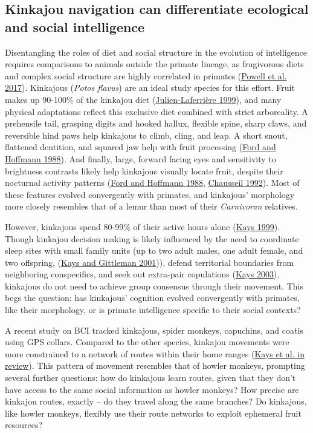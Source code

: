 \documentclass[twoside,12pt,final]{ucthesis-CA2012}
\begin{document}
\begin{ucmainmatter}
\hypertarget{kinkajou-navigation-can-differentiate-ecological-and-social-intelligence}{%
\subsection{Kinkajou navigation can differentiate ecological and social intelligence}\label{kinkajou-navigation-can-differentiate-ecological-and-social-intelligence}}

Disentangling the roles of diet and social structure in the evolution of intelligence requires comparisons to animals outside the primate lineage, as frugivorous diets and complex social structure are highly correlated in primates (\protect\hyperlink{ref-powell2017a}{Powell et al. 2017}). Kinkajous (\emph{Potos flavus}) are an ideal study species for this effort. Fruit makes up 90-100\% of the kinkajou diet (\protect\hyperlink{ref-julien-laferriere1999}{Julien-Laferrière 1999}), and many physical adaptations reflect this exclusive diet combined with strict arboreality. A prehensile tail, grasping digits and hooked hallux, flexible spine, sharp claws, and reversible hind paws help kinkajous to climb, cling, and leap. A short snout, flattened dentition, and squared jaw help with fruit processing (\protect\hyperlink{ref-ford1988}{Ford and Hoffmann 1988}). And finally, large, forward facing eyes and sensitivity to brightness contrasts likely help kinkajous visually locate fruit, despite their nocturnal activity patterns (\protect\hyperlink{ref-ford1988}{Ford and Hoffmann 1988}, \protect\hyperlink{ref-chausseil1992}{Chausseil 1992}). Most of these features evolved convergently with primates, and kinkajous' morphology more closely resembles that of a lemur than most of their \emph{Carnivoran} relatives.

However, kinkajous spend 80-99\% of their active hours alone (\protect\hyperlink{ref-kays1999a}{Kays 1999}). Though kinkajou decision making is likely influenced by the need to coordinate sleep sites with small family units (up to two adult males, one adult female, and two offspring, (\protect\hyperlink{ref-kays2001}{Kays and Gittleman 2001})), defend territorial boundaries from neighboring conspecifics, and seek out extra-pair copulations (\protect\hyperlink{ref-kays2003}{Kays 2003}), kinkajous do not need to achieve group consensus through their movement. This begs the question: has kinkajous' cognition evolved convergently with primates, like their morphology, or is primate intelligence specific to their social contexts?

A recent study on BCI tracked kinkajous, spider monkeys, capuchins, and coatis using GPS collars. Compared to the other species, kinkajou movements were more constrained to a network of routes within their home ranges (\protect\hyperlink{ref-kaysinreview}{Kays et al. in review}). This pattern of movement resembles that of howler monkeys, prompting several further questions: how do kinkajous learn routes, given that they don't have access to the same social information as howler monkeys? How precise are kinkajou routes, exactly -- do they travel along the same branches? Do kinkajous, like howler monkeys, flexibly use their route networks to exploit ephemeral fruit resources?


\end{ucmainmatter}
\end{document}
